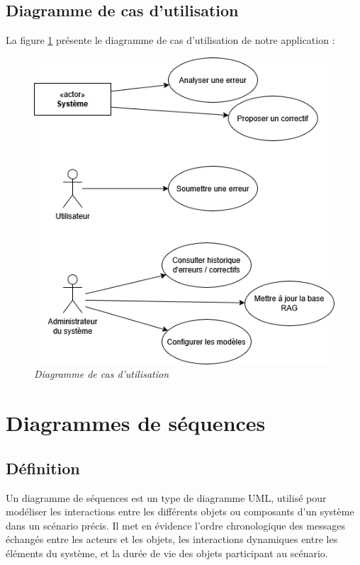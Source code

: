 \documentclass[12pt,a4paper]{report}
\begin{document}
	\subsection{Diagramme de cas d'utilisation}
	
	La figure \ref{fig:use-case} présente le diagramme de cas d'utilisation de notre application :
	
	\begin{figure}[H]
		\centering
		\includegraphics{use-case.drawio.png}
		\caption{\textit{Diagramme de cas d'utilisation}}
		\label{fig:use-case}
	\end{figure}
	
	\section{Diagrammes de séquences}
	
	\subsection{Définition}
	
	Un diagramme de séquences est un type de diagramme UML, utilisé pour modéliser les interactions entre les différents objets ou composants d'un système dans un scénario précis. Il met en évidence l'ordre chronologique des messages échangés entre les acteurs et les objets, les interactions dynamiques entre les éléments du système, et la durée de vie des objets participant au scénario.
	
\end{document}
